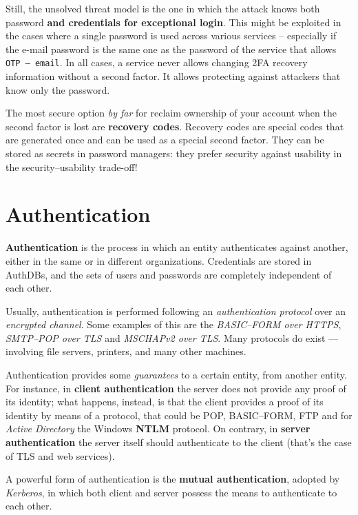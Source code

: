 \documentclass[10pt]{extreport}
\begin{document}
Still, the unsolved threat model is the one in which the attack knows both
password \textbf{and credentials for exceptional login}. This might be
exploited in the cases where a single password is used across various services
-- especially if the e\--mail password is the same one as the password of the
service that allows \texttt{OTP --- email}. In all cases, a service never allows
changing 2FA recovery information without a second factor. It allows protecting
against attackers that know only the password.

The most secure option \emph{by far} for reclaim ownership of your account when
the second factor is lost are \textbf{recovery codes}. Recovery codes are
special codes that are generated once and can be used as a special second
factor. They can be stored as secrets in password managers: they prefer
security against usability in the security\---usability trade\--off!


\chapter{Authentication}

\textbf{Authentication} is the process in which an entity authenticates against
another, either in the same or in different organizations. Credentials are
stored in AuthDBs, and the sets of users and passwords are completely
independent of each other.

Usually, authentication is performed following an \emph{authentication
protocol} over an \emph{encrypted channel}. Some examples of this are the
\emph{BASIC\---FORM over HTTPS}, \emph{SMTP\---POP over TLS} and \emph{MSCHAPv2
over TLS}. Many protocols do exist --- involving file servers, printers, and
many other machines.

Authentication provides some \emph{guarantees} to a certain entity, from
another entity. For instance, in \textbf{client authentication} the server does
not provide any proof of its identity; what happens, instead, is that the
client provides a proof of its identity by means of a protocol, that could be
POP, BASIC\---FORM, FTP and for \emph{Active Directory} the Windows
\textbf{NTLM} protocol. On contrary, in \textbf{server authentication} the
server itself should authenticate to the client (that's the case of TLS and web
services).

A powerful form of authentication is the \textbf{mutual authentication},
adopted by \emph{Kerberos}, in which both client and server possess the means
to authenticate to each other.
\end{document}
